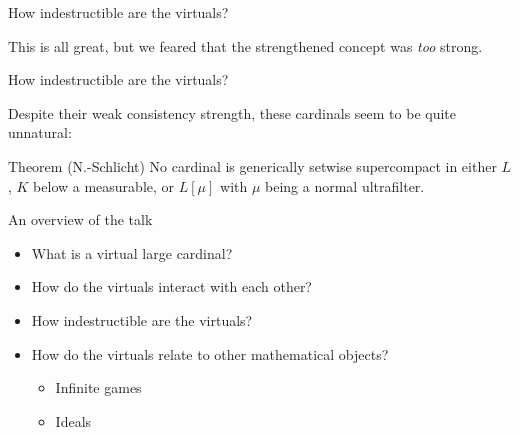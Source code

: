 \documentclass{beamer}
\begin{document}
\begin{frame}{How indestructible are the virtuals?}

  This is all great, but we feared that the strengthened concept was \textit{too} strong. 



\end{frame}

\begin{frame}{How indestructible are the virtuals?}

  Despite their weak consistency strength, these cardinals seem to be quite unnatural:

  \begin{block}{Theorem (N.-Schlicht)}
    No cardinal is generically setwise supercompact in either $L$, $K$ below a measurable, or $L[\mu]$ with $\mu$ being a normal ultrafilter.
  \end{block}

\end{frame}


\begin{frame}{An overview of the talk}
  \begin{itemize}
    \item What is a virtual large cardinal?
    \item How do the virtuals interact with each other?
    \item How indestructible are the virtuals?
    \item<alert@+> How do the virtuals relate to other mathematical objects?
      \begin{itemize}
        \item<alert@+> Infinite games
        \item Ideals
      \end{itemize}
  \end{itemize}
\end{frame}
\end{document}
